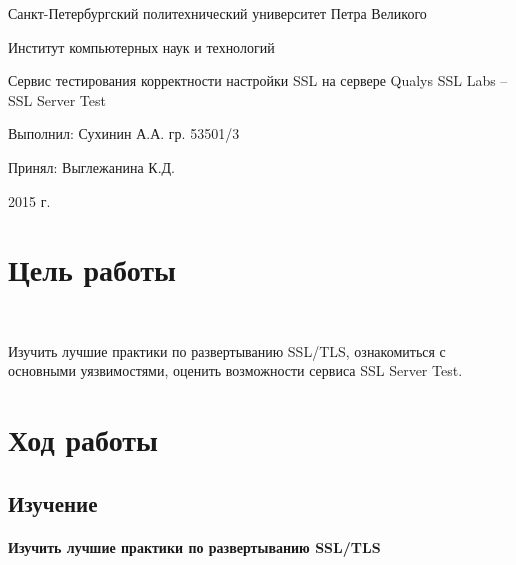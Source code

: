 \documentclass{article}
\begin{document}
\begin{titlepage} \begin{center}

	\Large			
Санкт-Петербургский политехнический университет Петра Великого
			
	\vspace{0.2cm}	
Институт компьютерных наук и технологий
		
	\vspace{2cm} \vfill \huge
Сервис тестирования корректности настройки SSL на сервере Qualys SSL Labs – SSL Server Test
		
	\vfill 
	\begin{flushleft} \large \hangindent=8cm 
Выполнил: Сухинин А.А. гр. 53501/3 \hrulefill
			
Принял: Выглежанина К.Д. \hrulefill
	\end{flushleft}
		
	\vspace{2cm} \vfill \LARGE
2015 г.
		
\end{center} \end{titlepage}

\section{Цель работы}
~

Изучить лучшие практики по развертыванию SSL/TLS, ознакомиться с основными уязвимостями, оценить возможности сервиса SSL Server Test.

\section{Ход работы}
\subsection{Изучение}

\paragraph{Изучить лучшие практики по развертыванию SSL/TLS}
\end{document}
